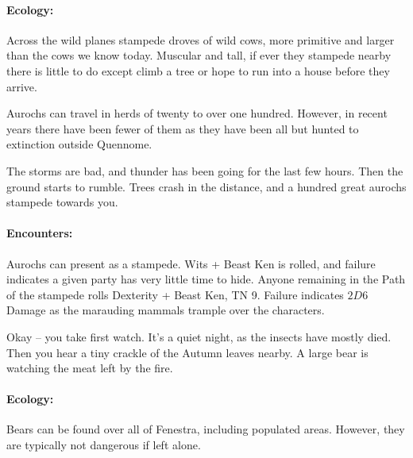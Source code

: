 \label{auroch}

\auroch

\paragraph{Ecology:} Across the wild planes stampede droves of wild cows, more primitive and larger than the cows we know today.  Muscular and tall, if ever they stampede nearby there is little to do except climb a tree or hope to run into a house before they arrive.

	Aurochs can travel in herds of twenty to over one hundred.  However, in recent years there have been fewer of them as they have been all but hunted to extinction outside Quennome.


\begin{boxtext}

	The storms are bad, and thunder has been going for the last few hours.  Then the ground starts to rumble.  Trees crash in the distance, and a hundred great aurochs stampede towards you.

\end{boxtext}

\paragraph{Encounters:} Aurochs can present as a stampede.  Wits + Beast Ken is rolled, and failure indicates a given party has very little time to hide.  Anyone remaining in the Path of the stampede rolls Dexterity + Beast Ken, TN 9.  Failure indicates $2D6$ Damage as the marauding mammals trample over the characters.

\label{bear}

\bear

\begin{boxtext}

	Okay -- you take first watch.  It's a quiet night, as the insects have mostly died.  Then you hear a tiny crackle of the Autumn leaves nearby.  A large bear is watching the meat left by the fire.

\end{boxtext}

\paragraph{Ecology:} Bears can be found over all of Fenestra, including populated areas.  However, they are typically not dangerous if left alone.

